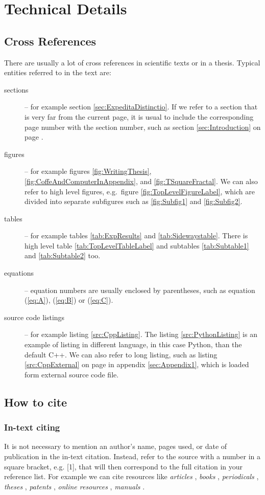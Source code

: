 \chapter{Technical Details}
\section{Cross References}
\label{sec:CrossReferences}
There are usually a lot of cross references in scientific texts or in a thesis. Typical entities referred to in the text are:
\begin{description}
	\item [sections] -- for example section \ref{sec:ExpeditaDistinctio}. If we refer to a section that is very far from the current page, it is usual to include the corresponding page number with the section number, such as section \ref{sec:Introduction} on page \pageref{sec:Introduction}.
	\item [figures] -- for example figures \ref{fig:WritingThesis}, \ref{fig:CoffeAndComputerInAppendix}, and \ref{fig:TSquareFractal}. We can also refer to high level figures, e.g.\ figure \ref{fig:TopLevelFigureLabel}, which are divided into separate subfigures such as \ref{fig:Subfig1} and \ref{fig:Subfig2}.
	\item [tables] -- for example tables \ref{tab:ExpResults} and \ref{tab:Sidewaystable}. There is high level table \ref{tab:TopLevelTableLabel} and subtables \ref{tab:Subtable1} and \ref{tab:Subtable2} too.
	\item [equations] -- equation numbers are usually enclosed by parentheses, such as equation (\ref{eq:A}), (\ref{eq:B}) or (\ref{eq:C}).
	\item [source code listings] -- for example listing \ref{src:CppListing}. The listing \ref{src:PythonListing} is an example of listing in different language, in this case Python, than the default C++. We can also refer to long listing, such as listing \ref{src:CppExternal} on page \pageref{src:CppExternal} in appendix \ref{sec:Appendix1}, which is loaded form external source code file.
\end{description}

\section{How to cite}
\label{sec:HowToCite}
\subsection{In-text citing}
It is not necessary to mention an author's name, pages used, or date of publication in the in-text citation. Instead, refer to the source with a number in a square bracket, e.g. [1], that will then correspond to the full citation in your reference list. For example we can cite resources like \emph{articles} \cite{herrmann, bertram, moore, yoon, sigfridsson, baez/article}, \emph{books} \cite{wilde, nietzsche:ksa1, averroes/bland, hammond, cotton, knuth:ct:a, gerhardt, gonzalez, companion}, \emph{periodicals} \cite{jcg}, \emph{theses} \cite{geer}, \emph{patents} \cite{kowalik, almendro, sorace, laufenberg}, \emph{online resources} \cite{ctan, wassenberg, itzhaki, markey, baez/online}, \emph{manuals} \cite{cms}.

